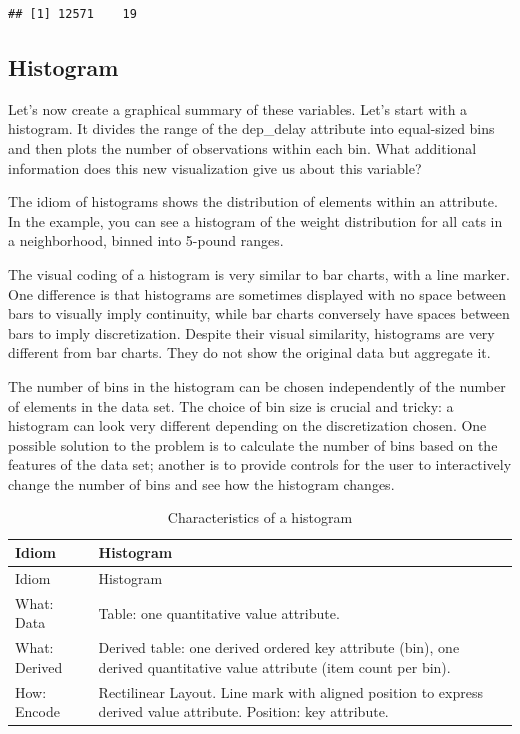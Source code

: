 \documentclass[
]{book}
\begin{document}
\begin{verbatim}
## [1] 12571    19
\end{verbatim}

\hypertarget{histogram}{%
\subsection{Histogram}\label{histogram}}

Let's now create a graphical summary of these variables. Let's start with a histogram. It divides the range of the dep\_delay attribute into equal-sized bins and then plots the number of observations within each bin. What additional information does this new visualization give us about this variable?

The idiom of histograms shows the distribution of elements within an attribute. In the example, you can see a histogram of the weight distribution for all cats in a neighborhood, binned into 5-pound ranges.

The visual coding of a histogram is very similar to bar charts, with a line marker. One difference is that histograms are sometimes displayed with no space between bars to visually imply continuity, while bar charts conversely have spaces between bars to imply discretization. Despite their visual similarity, histograms are very different from bar charts. They do not show the original data but aggregate it.

The number of bins in the histogram can be chosen independently of the number of elements in the data set. The choice of bin size is crucial and tricky: a histogram can look very different depending on the discretization chosen. One possible solution to the problem is to calculate the number of bins based on the features of the data set; another is to provide controls for the user to interactively change the number of bins and see how the histogram changes.

\begin{longtable}[]{@{}
  >{\raggedright\arraybackslash}p{}
  >{\raggedright\arraybackslash}p{}@{}}
\caption{Characteristics of a histogram \citep{munzner2014visualization}}\tabularnewline
\toprule
Idiom & Histogram \\
\midrule
\endfirsthead
\toprule
Idiom & Histogram \\
\midrule
\endhead
What: Data & Table: one quantitative value attribute. \\
What: Derived & Derived table: one derived ordered key attribute (bin), one derived quantitative value attribute (item count per bin). \\
How: Encode & Rectilinear Layout. Line mark with aligned position to express derived value attribute. Position: key attribute. \\
\bottomrule
\end{longtable}
\end{document}
